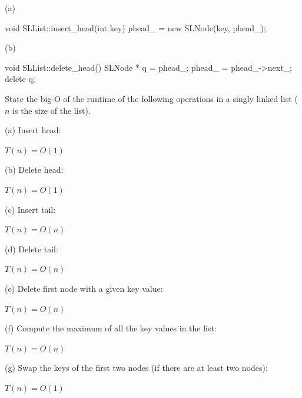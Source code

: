 (a)
\ANSWER
\begin{answercode}
void SLList::insert_head(int key)
{
  phead_ = new SLNode(key, phead_);
}
\end{answercode}

(b)
\ANSWER
\begin{answercode}
void SLList::delete_head()
{
  SLNode * q = phead_;
  phead_ = phead_->next_;
  delete q;
}
\end{answercode}

\newpage
\nextq %
State the big-O of the runtime of the following operations
in a singly linked list ($n$ is the size of the list).

(a)
Insert head:
\\
\ANSWER
\begin{answerlong}
$T(n) = O(1)$
\end{answerlong}


(b)
Delete head:
\\
\ANSWER
\begin{answerlong}
$T(n) = O(1)$
\end{answerlong}
    
(c)
Insert tail:
\\
\ANSWER
\begin{answerlong}
$T(n) = O(n)$
\end{answerlong}

(d)
Delete tail:
\\
\ANSWER
\begin{answerlong}
$T(n) = O(n)$
\end{answerlong}

(e)
Delete first node with a given key value:
\\
\ANSWER
\begin{answerlong}
$T(n) = O(n)$
\end{answerlong}
  
(f)
Compute the maximum of all the key values in the list:
\\
\ANSWER
\begin{answerlong}
$T(n) = O(n)$
\end{answerlong}
  
(g)
Swap the keys of the first two nodes (if there are at least two nodes):
\\
\ANSWER
\begin{answerlong}
$T(n) = O(1)$
\end{answerlong}

